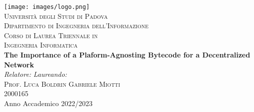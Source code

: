 



\begin{titlepage}
\begin{center}
\texttt{[image: images/logo.png]}\\

\vspace{0.8cm}
\textsc{\LARGE Universit\`{a} degli Studi di Padova}\\
\vspace{0.45cm}
\textsc{\large Dipartimento di Ingegneria dell'Informazione}\\
\vspace{0.4cm}
\textsc{\large Corso di Laurea Triennale in}\\
\textsc{\large Ingegneria Informatica}\\
\vfill
{ \LARGE \bfseries The Importance of a Plaform-Agnosting Bytecode for a Decentralized Network
}\\
\vfill
\textit{\large Relatore:} \hfill \textit{\large Laureando:}\\
\textsc{\large Prof. Luca Boldrin} \hfill \textsc{Gabriele Miotti}\\
\hfill \textsc{2000165}\\

\vfill
{\large Anno Accademico 2022/2023}
\end{center}
\end{titlepage}

\thispagestyle{empty} %
\cleardoublepage

\thispagestyle{empty}

\clearpage{\pagestyle{plain}\cleardoublepage}


\clearpage{\pagestyle{plain}\cleardoublepage}
\tableofcontents %

\clearpage{\pagestyle{plain}\cleardoublepage} %


\clearpage{\pagestyle{plain}\cleardoublepage} %


\clearpage{\pagestyle{plain}\cleardoublepage}


\clearpage{\pagestyle{plain}\cleardoublepage}


\clearpage{\pagestyle{plain}\cleardoublepage}


\clearpage{\pagestyle{plain}\cleardoublepage}


\clearpage{\pagestyle{plain}\cleardoublepage}




